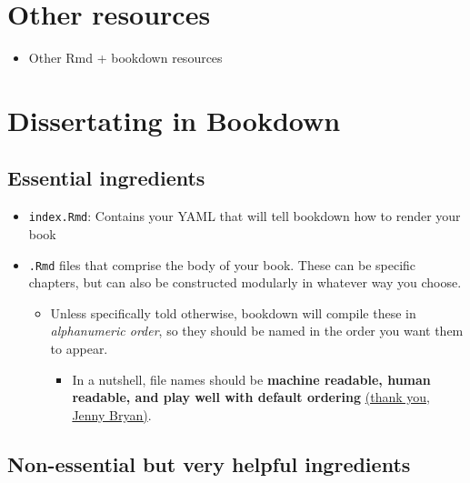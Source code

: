\documentclass[
  12pt,
  oneside]{book}
\providecommand{\tightlist}{%
  \setlength{\itemsep}{0pt}\setlength{\parskip}{0pt}}
\numberwithin{figure}{chapter}
\begin{document}
\hypertarget{other-resources}{%
\section{Other resources}\label{other-resources}}

\begin{itemize}
\tightlist
\item
  Other Rmd + bookdown resources
\end{itemize}

\hypertarget{dissertating-in-bookdown}{%
\section{Dissertating in Bookdown}\label{dissertating-in-bookdown}}

\hypertarget{essential-ingredients}{%
\subsection{Essential ingredients}\label{essential-ingredients}}

\begin{itemize}
\tightlist
\item
  \texttt{index.Rmd}: Contains your YAML that will tell bookdown how to render your book
\item
  \texttt{.Rmd} files that comprise the body of your book. These can be specific chapters, but can also be constructed modularly in whatever way you choose.

  \begin{itemize}
  \tightlist
  \item
    Unless specifically told otherwise, bookdown will compile these in \emph{alphanumeric order}, so they should be named in the order you want them to appear.

    \begin{itemize}
    \tightlist
    \item
      In a nutshell, file names should be \textbf{machine readable, human readable, and play well with default ordering} \href{https://speakerdeck.com/jennybc/how-to-name-files}{(thank you, Jenny Bryan)}.
    \end{itemize}
  \end{itemize}
\end{itemize}

\hypertarget{non-essential-but-very-helpful-ingredients}{%
\subsection{Non-essential but very helpful ingredients}\label{non-essential-but-very-helpful-ingredients}}
\end{document}
